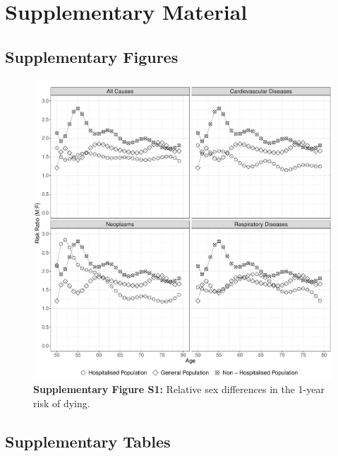 

\newpage


\section{Supplementary Material}


\subsection{Supplementary Figures}

	\begin{figure}[H]
		\centering
		\includegraphics[scale=0.425]{Paper_1/Paper1_SuppFig_1S}
		\caption*{\textbf{Supplementary Figure S1:} Relative sex differences in the 1-year risk of dying.}
	\label{ch2:figS1}
	\end{figure}



\newpage

\subsection{Supplementary Tables}


